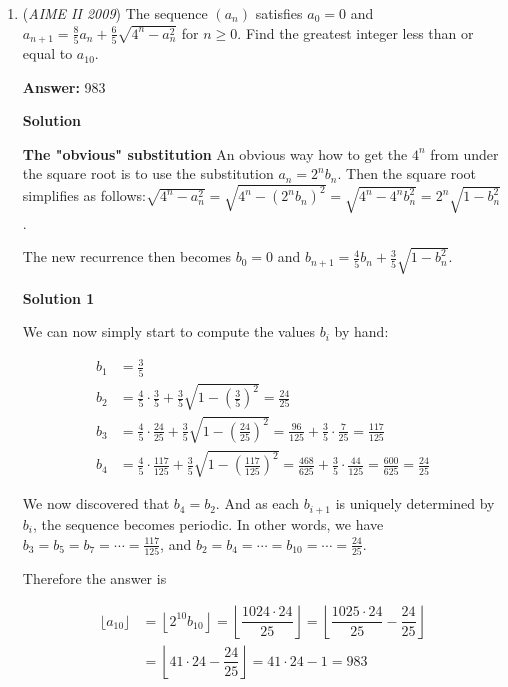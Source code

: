 \begin{enumerate}
	\item (\textit{AIME II 2009}) The sequence $(a_n)$ satisfies $a_0=0$ and $a_{n + 1} = \frac{8}{5}a_n + \frac{6}{5}\sqrt{4^n - a_n^2}$ for $n \geq 0$. Find the greatest integer less than or equal to $a_{10}$.


 
 \textbf{Answer: }983



\textbf{Solution}

\textbf{The "obvious" substitution} An obvious way how to get the $4^n$ from under the square root is to use the substitution $a_n = 2^n b_n$. Then the square root simplifies as follows:$\sqrt{4^n - a_n^2} = \sqrt{4^n - (2^n b_n)^2} = \sqrt{4^n - 4^n b_n^2} = 2^n \sqrt{1 - b_n^2}$.

 The new recurrence then becomes $b_0=0$ and $b_{n+1} = \frac45 b_n + \frac 35\sqrt{1 - b_n^2}$.

 



\textbf{Solution 1}

We can now simply start to compute the values $b_i$ by hand:

 
 \begin{align*} b_1 & = \frac 35 \\ b_2 & = \frac 45\cdot \frac 35 + \frac 35 \sqrt{1 - \left(\frac 35\right)^2} = \frac{24}{25} \\ b_3 & = \frac 45\cdot \frac {24}{25} + \frac 35 \sqrt{1 - \left(\frac {24}{25}\right)^2} = \frac{96}{125} + \frac 35\cdot\frac 7{25} = \frac{117}{125} \\ b_4 & = \frac 45\cdot \frac {117}{125} + \frac 35 \sqrt{1 - \left(\frac {117}{125}\right)^2} = \frac{468}{625} + \frac 35\cdot\frac {44}{125} = \frac{600}{625} = \frac{24}{25} \end{align*}


 We now discovered that $b_4=b_2$. And as each $b_{i+1}$ is uniquely determined by $b_i$, the sequence becomes periodic. In other words, we have $b_3=b_5=b_7=\cdots=\frac{117}{125}$, and $b_2=b_4=\cdots=b_{10}=\cdots=\frac{24}{25}$.

 Therefore the answer is 

 
 \begin{align*} \lfloor a_{10} \rfloor & = \left\lfloor 2^{10} b_{10} \right\rfloor = \left\lfloor \dfrac{1024\cdot 24}{25} \right\rfloor  = \left\lfloor \dfrac{1025\cdot 24}{25} - \dfrac{24}{25} \right\rfloor  \\ &  = \left\lfloor 41\cdot 24 - \dfrac{24}{25} \right\rfloor = 41\cdot 24 - 1 = \boxed{983} \end{align*}






\end{enumerate}
